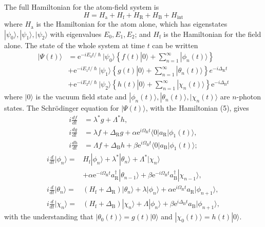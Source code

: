 \documentclass[12pt,a4paper,reqno]{article}
\renewcommand{\(}{\left(}
\renewcommand{\)}{\right)}
\newcommand{\e}{\mbox{e}}
\renewcommand{\hbar}{\hslash}
\newcommand{\tR}{\text{R}}
\newcommand{\tB}{\text{B}}
\newcommand{\ta}{\text{a}}
\newcommand{\tf}{\text{f}}
\newcommand{\<}{\langle}
\renewcommand{\>}{\rangle}
\theoremstyle{plain} %
\theoremstyle{definition}
\theoremstyle{remark}
\begin{document}
The full Hamiltonian for the atom-field system is 
\begin{equation}
H = H_{\ta} + H_{\tf} + H_{\tR} + H_{\tB} + H_{\text{int}}
\end{equation}
where $H_{\ta}$ is the Hamiltonian for the atom alone, which has
eigenstates $|\psi_0\>,|\psi_1\>,|\psi_2\>$ with eigenvalues $E_0, E_1, E_2$; and
$H_{\tf}$ is the Hamiltonian for the field alone. The state of the whole
system at time $t$ can be written
\begin{equation}
\begin{aligned}\label{6}
|\Psi(t)\> &= \e^{-iE_0t/\hbar}|\psi_0\>\left\{ f(t)|0\> 
+ \sum_{n=1}^\infty|\phi_n(t)\>\right\} \\
& + \e^{-iE_1t/\hbar}|\psi_1\>\left\{ g(t)|0\> +
\sum_{n=1}^\infty|\theta_n(t)\>\right\} e^{-i\Delta_{\tR} t}\\
& + \e^{-iE_2t/\hbar}|\psi_2\>\left\{ h(t)|0\> +
\sum_{n=1}^\infty|\chi_n(t)\>\right\}\e^{-i\Delta_{\tB} t}
\end{aligned}
\end{equation}
where $|0\>$ is the vacuum field state and $|\phi_n(t)\>,
|\theta_n(t)\>, |\chi_n(t)\>$ are $n$-photon states. The Schr\"odinger
equation for $|\Psi(t)\>$, with the Hamiltonian (5), gives
\begin{equation}\label{7}
\begin{aligned}
i\frac{df}{dt} &= \lambda^*g + \Lambda^*h,\\
i\frac{dg}{dt} &= \lambda f + \Delta_{\tR} g + \alpha \e^{i\Omega_{\tR}
t}\<0|a_{\tR}|\phi_1(t)\>,\\ 
i\frac{dh}{dt} &= \Lambda f + \Delta_{\tB} h + \beta \e^{i\Omega_{\tB}
t}\<0|a_{\tB}|\phi_1(t)\>;
\end{aligned}
\end{equation}
\begin{equation}\label{8}
\begin{aligned}
i\frac{d}{dt}|\phi_n\> =& H_{\tf}|\phi_n\> + \lambda^*|\theta_n\> +
\Lambda^*|\chi_n\>\\
&+\alpha\e^{-i\Omega_{\tR} t}a_{\tR}^\dagger|\theta_{n-1}\> +
\beta\e^{-i\Omega_{\tB}t}a_{\tB}^\dagger|\chi_{n-1}\>,\\
i\frac{d}{dt}|\theta_n\> =&\(H_{\tf} + \Delta_{\tR}\)|\theta_n\> +
\lambda|\phi_n\> + \alpha\e^{i\Omega_{\tR} t}a_{\tR}|\phi_{n+1}\>,\\
i\frac{d}{dt}|\chi_n\> =& \(H_{\tf} + \Delta_{\tB}\)|\chi_n\> +
\Lambda|\phi_n\> + \beta\e^{i\Delta_{\tB} t}a_{\tB}|\phi_{n+1}\>,
\end{aligned}
\end{equation}
with the understanding that $|\theta_0(t)\> = g(t)|0\>$ and
$|\chi_0(t)\> = h(t)|0\>$.
\end{document}
